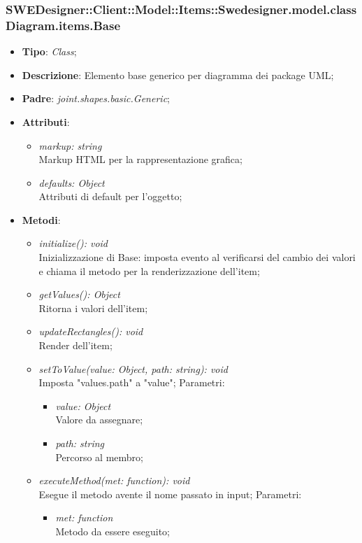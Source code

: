 \documentclass[../DefinizioneDiProdotto.tex]{subfiles}
\begin{document}
			\subsubsection{SWEDesigner::Client::Model::Items::Swedesigner.model.classDiagram.items.Base}
			\hypertarget{SWEDesigner::Client::Model::Items::Swedesigner.model.classDiagram.items.Base}{}
			\begin{itemize}
				\item \textbf{Tipo}: \emph{Class};
				\item \textbf{Descrizione}: Elemento base generico per diagramma dei package UML;
				\item \textbf{Padre}: \emph{joint.shapes.basic.Generic};
				\item \textbf{Attributi}:
				\begin{itemize}
					\item \emph{markup: string}\\
					Markup HTML per la rappresentazione grafica;
					\item \emph{defaults: Object}\\
					Attributi di default per l'oggetto;
				\end{itemize}
				\item \textbf{Metodi}:
				\begin{itemize}
					\item \emph{initialize(): void}\\
					Inizializzazione di Base: imposta evento al verificarsi del cambio dei valori e chiama il metodo per la renderizzazione dell'item;
					\item \emph{getValues(): Object}\\
					Ritorna i valori dell'item;
					\item \emph{updateRectangles(): void}\\
					Render dell'item;	
					\item \emph{setToValue(value: Object, path: string): void}\\
					Imposta "values.path" a "value";
					Parametri:
					\begin{itemize}
						\item \emph{value: Object} \\
						Valore da assegnare;
						\item \emph{path: string} \\
						Percorso al membro;
					\end{itemize}
					\item \emph{executeMethod(met: function): void}\\
					Esegue il metodo avente il nome passato in input;
					Parametri:
					\begin{itemize}
						\item \emph{met: function} \\
						Metodo da essere eseguito;
					\end{itemize}
				\end{itemize}
			\end{itemize}
			
\end{document}
